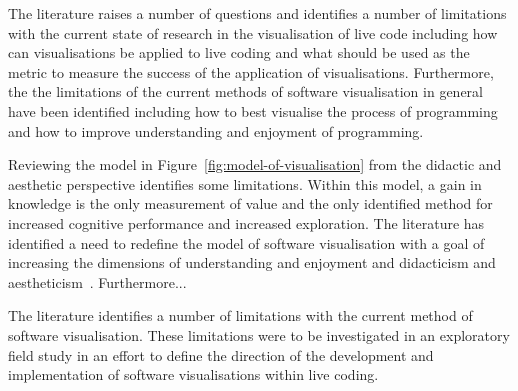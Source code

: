 The literature raises a number of questions and identifies a number of limitations with the current state of research in the visualisation of live code including how can visualisations be applied to live coding and what should be used as the metric to measure the success of the application of visualisations. Furthermore, the the limitations of the current methods of software visualisation in general have been identified including how to best visualise the process of programming and how to improve understanding and enjoyment of programming.



Reviewing the model in Figure~\ref{fig:model-of-visualisation} from the didactic and aesthetic perspective identifies some limitations. Within this model, a gain in knowledge is the only measurement of value and the only identified method for increased cognitive performance and increased exploration. The literature has identified a need to redefine the model of software visualisation with a goal of increasing the dimensions of understanding and enjoyment and didacticism and aestheticism~. Furthermore...

The literature identifies a number of limitations with the current method of software visualisation. These limitations were to be investigated in an exploratory field study in an effort to define the direction of the development and implementation of software visualisations within live coding. 



